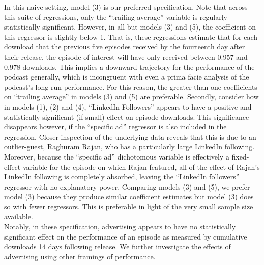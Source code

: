 \documentclass[11pt, letterpaper, twoside]{article}
\begin{document}
In this naive setting, model (3) is our preferred specification. Note that across this suite of regressions, only the ``trailing average'' variable is regularly statistically significant. However, in all but models (3) and (5), the coefficient on this regressor is slightly below 1. That is, these regressions estimate that for each download that the previous five episodes received by the fourteenth day after their release, the episode of interest will have only received between 0.957 and 0.978 downloads. This implies a downward trajectory for the performance of the podcast generally, which is incongruent with even a prima facie analysis of the podcast's long-run performance. For this reason, the greater-than-one coefficients on ``trailing average'' in models (3) and (5) are preferable. Secondly, consider how in models (1), (2) and (4), ``LinkedIn Followers'' appears to have a positive and statistically significant (if small) effect on episode downloads. This significance disappears however, if the ``specific ad'' regressor is also included in the regression. Closer inspection of the underlying data reveals that this is due to an outlier-guest, Raghuram Rajan, who has a particularly large LinkedIn following. Moreover, because the ``specific ad'' dichotomous variable is effectively a fixed-effect variable for the episode on which Rajan featured, all of the effect of Rajan's LinkedIn following is completely absorbed, leaving the ``LinkedIn followers'' regressor with no explanatory power. Comparing models (3) and (5), we prefer model (3) because they produce similar coefficient estimates but model (3) does so with fewer regressors. This is preferable in light of the very small sample size available.\\

Notably, in these specification, advertising appears to have no statistically significant effect on the performance of an episode as measured by cumulative downloads 14 days following release. We further investigate the effects of advertising using other framings of performance. 
\end{document}
